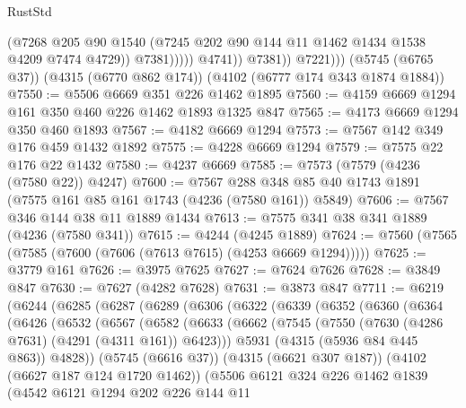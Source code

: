 \begin{lexlean}{RustStd}
\begin{coremodule}
                            (@7268
                              @205
                              @90
                              @1540
                              (@7245 @202 @90 @144 @11 @1462 @1434 @1538 @4209 @7474 @4729))
                            @7381)))))
                  @4741))
              @7381))
          @7221)))
    (@5745 (@6765 @37))
    (@4315 (@6770 @862 @174))
    (@4102 (@6777 @174 @343 @1874 @1884))
@7550 := @5506 @6669 @351 @226 @1462 @1895
@7560 := @4159 @6669 @1294 @161 @350 @460 @226 @1462 @1893 @1325 @847
@7565 := @4173 @6669 @1294 @350 @460 @1893
@7567 := @4182 @6669 @1294
@7573 := @7567 @142 @349 @176 @459 @1432 @1892
@7575 := @4228 @6669 @1294
@7579 := @7575 @22 @176 @22 @1432
@7580 := @4237 @6669
@7585 := @7573 (@7579 (@4236 (@7580 @22)) @4247)
@7600 := @7567 @288 @348 @85 @40 @1743 @1891 (@7575 @161 @85 @161 @1743 (@4236 (@7580 @161)) @5849)
@7606 := @7567 @346 @144 @38 @11 @1889 @1434
@7613 := @7575 @341 @38 @341 @1889 (@4236 (@7580 @341))
@7615 := @4244 (@4245 @1889)
@7624 := @7560 (@7565 (@7585 (@7600 (@7606 (@7613 @7615) (@4253 @6669 @1294)))))
@7625 := @3779 @161
@7626 := @3975 @7625
@7627 := @7624 @7626
@7628 := @3849 @847
@7630 := @7627 (@4282 @7628)
@7631 := @3873 @847
@7711 := @6219
    (@6244
      (@6285
        (@6287
          (@6289
            (@6306
              (@6322
                (@6339
                  (@6352
                    (@6360
                      (@6364
                        (@6426
                          (@6532
                            (@6567
                              (@6582
                                (@6633
                                  (@6662
                                    (@7545 (@7550 (@7630 (@4286 @7631) (@4291 (@4311 @161)) @6423)))
                                    @5931
                                    (@4315 (@5936 @84 @445 @863))
                                    @4828))
                                (@5745 (@6616 @37))
                                (@4315 (@6621 @307 @187))
                                (@4102 (@6627 @187 @124 @1720 @1462))
                                (@5506
                                  @6121
                                  @324
                                  @226
                                  @1462
                                  @1839
                                  (@4542
                                    @6121
                                    @1294
                                    @202
                                    @226
                                    @144
                                    @11

\end{coremodule}
\end{lexlean}
